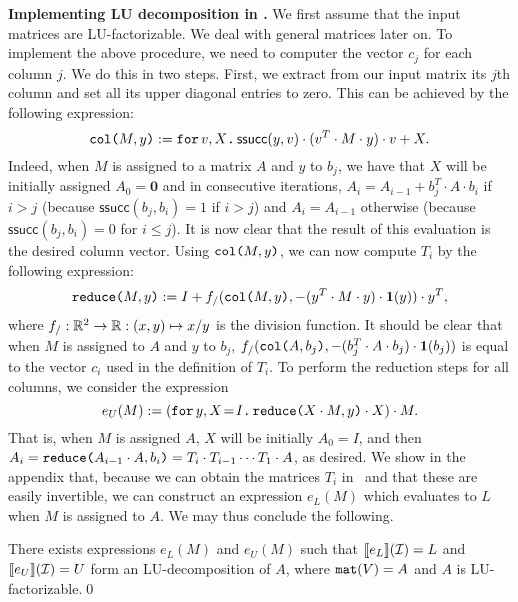 \smallskip
\noindent
\textbf{Implementing LU decomposition in \langfor.} 
We first assume that the input matrices are LU-factorizable. We deal with general matrices later on.
To implement the above procedure, we need to computer the vector $c_j$ for each column $j$. We do this in two steps. First, we extract from our input matrix its $j$th column and set all its upper diagonal entries to zero. This can be achieved by the following expression:
$$\ccol{M}{y} := \ffor{v}{X}{\mathsf{ssucc}(y,v)\cdot(v^T\cdot M \cdot y)\cdot v + X}.$$
Indeed, when $M$ is assigned to a matrix $A$ and $y$ to $b_j$, we have that $X$ will be initially assigned
$A_0=\mathbf{0}$ and in consecutive iterations,  $A_i=A_{i-1}+ b_j^T\cdot A\cdot b_i$ if $i>j$ (because $\mathsf{ssucc}(b_j,b_i)=1$ if $i>j$) and $A_i=A_{i-1}$ otherwise (because $\mathsf{ssucc}(b_j,b_i)=0$ for $i\leq j$). It is now clear that the result of this evaluation is the desired column vector.
%
%
Using $\ccol{M}{y}$, we can now compute $T_i$ by the following expression:
$$\red{M}{y} := I + f_/(\ccol{M}{y},-(y^T\cdot M\cdot y)\cdot \ones(y))\cdot y^T,$$
where $f_/:\RR^2\to\RR:(x,y)\mapsto x/y$ is the division function. It should be clear that when $M$ is assigned to $A$ and $y$ to $b_j$, $f_/(\ccol{A}{b_j},-(b_j^T\cdot A\cdot b_j)\cdot \ones(b_j))$ is equal to the vector $c_i$ used in the definition of $T_i$. To perform the reduction steps for all columns, we consider
the expression
$$
e_{U}(M) :=  \left( \initf{I}{y}{X}{\red{X\cdot M}{y}\cdot X} \right) \cdot M.
$$
That is, when $M$ is assigned $A$, $X$ will be initially $A_0=I$, and then
$A_i=\red{A_{i-1}\cdot A}{b_i}=T_i\cdot T_{i-1}\cdots T_1\cdot A$, as desired.
We show in the appendix that, because we can obtain the matrices $T_i$ in \langfor\ and that these
are easily invertible, we can construct an expression $e_L(M)$ which evaluates to $L$ when $M$ is assigned to
$A$. We may thus conclude the following.
\begin{proposition}\label{prop:gauss}
There exists \langfor expressions $e_L(M)$ and $e_U(M)$ such that
$\sem{e_L}{\I}=L$ and $\sem{e_U}{\I}=U$ form an LU-decomposition of $A$,
where $\conc(V)=A$ and $A$ is LU-factorizable.\qed
\end{proposition}

